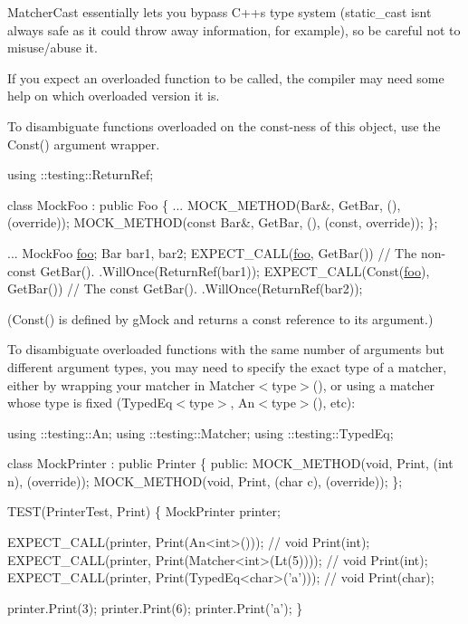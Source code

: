 {\ttfamily Matcher\+Cast} essentially lets you bypass C++\textquotesingle{}s type system ({\ttfamily static\+\_\+cast} isn\textquotesingle{}t always safe as it could throw away information, for example), so be careful not to misuse/abuse it.

If you expect an overloaded function to be called, the compiler may need some help on which overloaded version it is.

To disambiguate functions overloaded on the const-\/ness of this object, use the {\ttfamily Const()} argument wrapper.


\begin{DoxyCode}
using ::testing::ReturnRef;

\textcolor{keyword}{class }MockFoo : \textcolor{keyword}{public} Foo \{
  ...
  MOCK\_METHOD(Bar&, GetBar, (), (\textcolor{keyword}{override}));
  MOCK\_METHOD(\textcolor{keyword}{const} Bar&, GetBar, (), (\textcolor{keyword}{const}, \textcolor{keyword}{override}));
\};

...
  MockFoo \mbox{\hyperlink{namespacefoo}{foo}};
  Bar bar1, bar2;
  EXPECT\_CALL(\mbox{\hyperlink{namespacefoo}{foo}}, GetBar())         \textcolor{comment}{// The non-const GetBar().}
      .WillOnce(ReturnRef(bar1));
  EXPECT\_CALL(Const(\mbox{\hyperlink{namespacefoo}{foo}}), GetBar())  \textcolor{comment}{// The const GetBar().}
      .WillOnce(ReturnRef(bar2));
\end{DoxyCode}


({\ttfamily Const()} is defined by g\+Mock and returns a {\ttfamily const} reference to its argument.)

To disambiguate overloaded functions with the same number of arguments but different argument types, you may need to specify the exact type of a matcher, either by wrapping your matcher in {\ttfamily Matcher$<$type$>$()}, or using a matcher whose type is fixed ({\ttfamily Typed\+Eq$<$type$>$}, {\ttfamily An$<$type$>$()}, etc)\+:


\begin{DoxyCode}
using ::testing::An;
using ::testing::Matcher;
using ::testing::TypedEq;

\textcolor{keyword}{class }MockPrinter : \textcolor{keyword}{public} Printer \{
 \textcolor{keyword}{public}:
  MOCK\_METHOD(\textcolor{keywordtype}{void}, Print, (\textcolor{keywordtype}{int} n), (\textcolor{keyword}{override}));
  MOCK\_METHOD(\textcolor{keywordtype}{void}, Print, (\textcolor{keywordtype}{char} c), (\textcolor{keyword}{override}));
\};

TEST(PrinterTest, Print) \{
  MockPrinter printer;

  EXPECT\_CALL(printer, Print(An<int>()));            \textcolor{comment}{// void Print(int);}
  EXPECT\_CALL(printer, Print(Matcher<int>(Lt(5))));  \textcolor{comment}{// void Print(int);}
  EXPECT\_CALL(printer, Print(TypedEq<char>(\textcolor{charliteral}{'a'})));   \textcolor{comment}{// void Print(char);}

  printer.Print(3);
  printer.Print(6);
  printer.Print(\textcolor{charliteral}{'a'});
\}
\end{DoxyCode}


